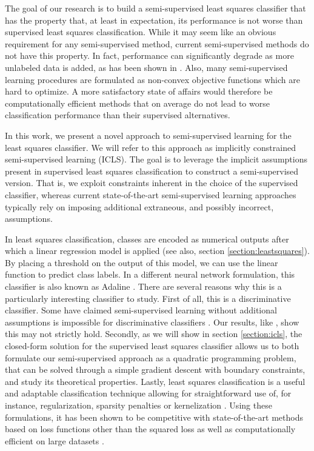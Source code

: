 \documentclass{llncs}
\begin{document}
The goal of our research is to build a semi-supervised least squares classifier that has the property that, at least in expectation, its performance is not worse than supervised least squares classification. While it may seem like an obvious requirement for any semi-supervised method, current semi-supervised methods do not have this property. In fact, performance can significantly degrade as more unlabeled data is added, as has been shown in \cite{Cozman2006}. Also, many semi-supervised learning procedures are formulated as non-convex objective functions which are hard to optimize. A more satisfactory state of affairs would therefore be computationally efficient methods that on average do not lead to worse classification performance than their supervised alternatives.

In this work, we present a novel approach to semi-supervised learning for the least squares classifier. We will refer to this approach as implicitly constrained semi-supervised learning (ICLS). The goal is to leverage the implicit assumptions present in supervised least squares classification to construct a semi-supervised version. That is, we exploit constraints inherent in the choice of the supervised classifier, whereas current state-of-the-art semi-supervised learning approaches typically rely on imposing additional extraneous, and possibly incorrect, assumptions.

In least squares classification, classes are encoded as numerical outputs after which a linear regression model is applied (see also, section \ref{section:leastsquares}). By placing a threshold on the output of this model, we can use the linear function to predict class labels. In a different neural network formulation, this classifier is also known as Adaline \cite{Widrow1960}. There are several reasons why this is a particularly interesting classifier to study. First of all, this is a discriminative classifier. Some have claimed semi-supervised learning without additional assumptions is impossible for discriminative classifiers \cite{Seeger2001,Singh2008}. Our results, like \cite{Sokolovska2008}, show this may not strictly hold. Secondly, as we will show in section \ref{section:icls}, the closed-form solution for the supervised least squares classifier allows us to both formulate our semi-supervised approach as a quadratic programming problem, that can be solved through a simple gradient descent with boundary constraints, and study its theoretical properties. Lastly, least squares classification is a useful and adaptable classification technique  allowing for straightforward use of, for instance, regularization, sparsity penalties or kernelization \cite{Hastie2001,Rifkin2003,Tibshirani1996,Poggio2003}. Using these formulations, it has been shown to be competitive with state-of-the-art methods based on loss functions other than the squared loss \cite{Rifkin2003} as well as computationally efficient on large datasets \cite{Bottou2010}.
\end{document}
